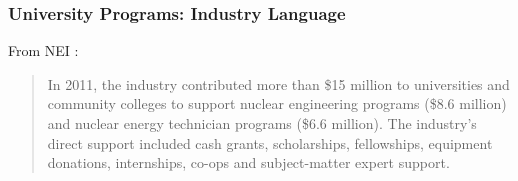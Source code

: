 \begin{frame}[ctb!]
  \frametitle{University Programs: Industry Language}  
  From NEI \cite{nei_statement}:
  \begin{quote}
    In 2011, the industry contributed more than \$15 million to 
    universities and community colleges to support nuclear engineering 
    programs (\$8.6 million) and nuclear energy technician programs 
    (\$6.6 million). The industry’s direct support included cash grants, 
    scholarships, fellowships, equipment donations, internships, co-ops 
    and subject-matter expert support.
  \end{quote}
\end{frame}
